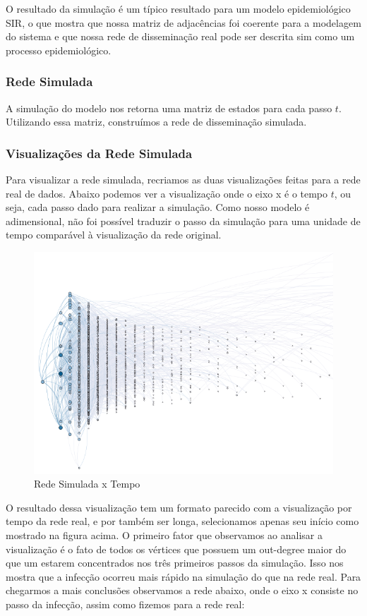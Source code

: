 \documentclass[a4paper,12pt]{article}
\begin{document}
O resultado da simulação é um típico resultado para um modelo epidemiológico SIR, o que mostra que nossa matriz de adjacências foi coerente
para a modelagem do sistema e que nossa rede de disseminação real pode ser descrita sim como um processo epidemiológico.

\pagebreak
\subsubsection{Rede Simulada}

A simulação do modelo nos retorna uma matriz de estados para cada passo $t$. Utilizando essa matriz, construímos a rede de disseminação simulada.

\subsubsection{Visualizações da Rede Simulada}

Para visualizar a rede simulada, recriamos as duas visualizações feitas para a rede real de dados. Abaixo podemos ver a visualização
onde o eixo x é o tempo $t$, ou seja, cada passo dado para realizar a simulação. Como nosso modelo é adimensional, não foi 
possível traduzir o passo da simulação para uma unidade de tempo comparável à visualização da rede original.


\begin{figure}[ht]
 \centering
 \includegraphics[scale=0.8]{../results/simul.png}
 \caption{Rede Simulada x Tempo}
\end{figure}

\pagebreak
O resultado dessa visualização tem um formato parecido com a visualização por tempo da rede real, e por também ser longa, selecionamos 
apenas seu início como mostrado na figura acima. O primeiro fator que observamos ao analisar a visualização é o fato de todos os vértices
que possuem um out-degree maior do que um estarem concentrados nos três primeiros passos da simulação. Isso nos mostra que a infecção ocorreu
mais rápido na simulação do que na rede real. Para chegarmos a mais conclusões observamos a rede abaixo, onde o eixo x consiste no passo da
infecção, assim como fizemos para a rede real:
\end{document}
